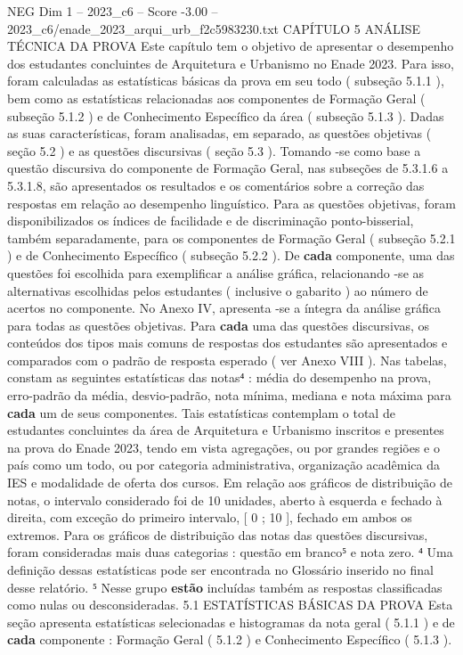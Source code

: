 \begin{textsample}{NEG Dim 1 – 2023\_c6 – Score -3.00 – 2023\_c6/enade\_2023\_arqui\_urb\_f2c5983230.txt}  \label{ex:f1_neg_207}
CAPÍTULO 5 ANÁLISE TÉCNICA DA PROVA Este capítulo tem o objetivo de apresentar o desempenho dos estudantes concluintes de Arquitetura e Urbanismo no Enade 2023.
Para isso, foram calculadas as estatísticas básicas da prova em seu todo ( subseção 5.1.1 ), bem como as estatísticas relacionadas aos componentes de Formação Geral ( subseção 5.1.2 ) e de Conhecimento Específico da área ( subseção 5.1.3 ).
Dadas as suas características, foram analisadas, em separado, as questões objetivas ( seção 5.2 ) e as questões discursivas ( seção 5.3 ).
Tomando -se como base a questão discursiva do componente de Formação Geral, nas subseções de 5.3.1.6 a 5.3.1.8, são apresentados os resultados e os comentários sobre a correção das respostas em relação ao desempenho linguístico.
Para as questões objetivas, foram disponibilizados os índices de facilidade e de discriminação ponto-bisserial, também separadamente, para os componentes de Formação Geral ( subseção 5.2.1 ) e de Conhecimento Específico ( subseção 5.2.2 ).
De \textbf{cada} componente, uma das questões foi escolhida para exemplificar a análise gráfica, relacionando -se as alternativas escolhidas pelos estudantes ( inclusive o gabarito ) ao número de acertos no componente.
No Anexo IV, apresenta -se a íntegra da análise gráfica para todas as questões objetivas.
Para \textbf{cada} uma das questões discursivas, os conteúdos dos tipos mais comuns de respostas dos estudantes são apresentados e comparados com o padrão de resposta esperado ( ver Anexo VIII ).
Nas tabelas, constam as seguintes estatísticas das notas⁴ : média do desempenho na prova, erro-padrão da média, desvio-padrão, nota mínima, mediana e nota máxima para \textbf{cada} um de seus componentes.
Tais estatísticas contemplam o total de estudantes concluintes da área de Arquitetura e Urbanismo inscritos e presentes na prova do Enade 2023, tendo em vista agregações, ou por grandes regiões e o país como um todo, ou por categoria administrativa, organização acadêmica da IES e modalidade de oferta dos cursos.
Em relação aos gráficos de distribuição de notas, o intervalo considerado foi de 10 unidades, aberto à esquerda e fechado à direita, com exceção do primeiro intervalo, [ 0 ; 10 ], fechado em ambos os extremos.
Para os gráficos de distribuição das notas das questões discursivas, foram consideradas mais duas categorias : questão em branco⁵ e nota zero. ⁴ Uma definição dessas estatísticas pode ser encontrada no Glossário inserido no final desse relatório. ⁵ Nesse grupo \textbf{estão} incluídas também as respostas classificadas como nulas ou desconsideradas. 5.1 ESTATÍSTICAS BÁSICAS DA PROVA Esta seção apresenta estatísticas selecionadas e histogramas da nota geral ( 5.1.1 ) e de \textbf{cada} componente : Formação Geral ( 5.1.2 ) e Conhecimento Específico ( 5.1.3 ).

\end{textsample}
